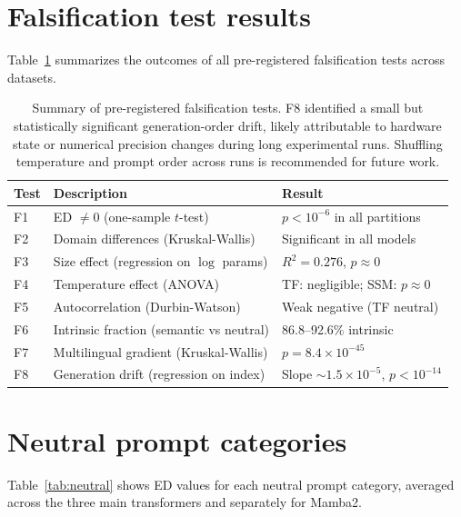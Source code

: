 \documentclass{article}
\begin{document}



\appendix

\section{Falsification test results}
\label{app:falsification}

Table~\ref{tab:falsification} summarizes the outcomes of all pre-registered falsification tests across datasets.

\begin{table}[H]
\centering
\small
\begin{tabular}{lll}
\toprule
\textbf{Test} & \textbf{Description} & \textbf{Result} \\
\midrule
F1 & ED $\neq 0$ (one-sample $t$-test) & $p < 10^{-6}$ in all partitions \\
F2 & Domain differences (Kruskal-Wallis) & Significant in all models \\
F3 & Size effect (regression on $\log$ params) & $R^2 = 0.276$, $p \approx 0$ \\
F4 & Temperature effect (ANOVA) & TF: negligible; SSM: $p \approx 0$ \\
F5 & Autocorrelation (Durbin-Watson) & Weak negative (TF neutral) \\
F6 & Intrinsic fraction (semantic vs neutral) & 86.8--92.6\% intrinsic \\
F7 & Multilingual gradient (Kruskal-Wallis) & $p = 8.4 \times 10^{-45}$ \\
F8 & Generation drift (regression on index) & Slope $\sim 1.5 \times 10^{-5}$, $p < 10^{-14}$ \\
\bottomrule
\end{tabular}
\caption{Summary of pre-registered falsification tests. F8 identified a small but statistically significant generation-order drift, likely attributable to hardware state or numerical precision changes during long experimental runs. Shuffling temperature and prompt order across runs is recommended for future work.}
\label{tab:falsification}
\end{table}

\section{Neutral prompt categories}
\label{app:neutral}

Table~\ref{tab:neutral} shows ED values for each neutral prompt category, averaged across the three main transformers and separately for Mamba2.
\end{document}
